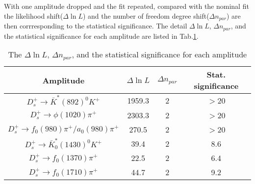 {With one amplitude dropped and the fit repeated, compared with the nominal fit the likelihood shift($\Delta\ln L$) and the number of freedom degree shift($\Delta n_{par}$) are then corrresponding to the statistical significance.
The detail $\Delta\ln L$, $\Delta n_{par}$, and the statistical significance for each amplitude are  listed in Tab.\ref{significance-table}.
\begin{table}
    \caption{The $\Delta\ln L$, $\Delta n_{par}$, and the statistical significance for each amplitude}
    \label{significance-table}
    \begin{center}
        \begin{tabular}{cccc}
            \hline
            Amplitude & $\Delta\ln L$ & $\Delta n_{par}$ & Stat. significance\\
            \hline
            $D_{s}^{+} \rightarrow \bar{K}^{*}(892)^{0}K^{+}$              & 1959.3     & 2   & $>$20\\
            $D_{s}^{+} \rightarrow \phi(1020)\pi^{+}$                      & 2303.3     & 2   & $>$20\\
            $D_{s}^{+} \rightarrow f_{0}(980)\pi^{+}/a_{0}(980)\pi^{+}$    & 270.5      & 2   & $>$20\\
            $D_{s}^{+} \rightarrow \bar{K}^{*}_{0}(1430)^{0}K^{+}$         & 39.4       & 2   & 8.6\\
            $D_{s}^{+} \rightarrow f_{0}(1370)\pi^{+}$                     & 22.5       & 2   & 6.4\\
            $D_{s}^{+} \rightarrow f_{0}(1710)\pi^{+}$                     & 44.7       & 2   & 9.2\\
            \hline
        \end{tabular}
    \end{center}
\end{table}

}

